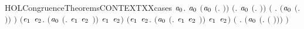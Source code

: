 \begin{SaveVerbatim}{HOLCongruenceTheoremsCONTEXTXXcases}
\HOLTokenTurnstile{} \HOLSymConst{\HOLTokenForall{}}\ensuremath{\HOLBoundVar{a}\sb{\mathrm{0}}}.
        \ensuremath{\HOLBoundVar{a}\sb{\mathrm{0}}} \HOLSymConst{\HOLTokenEquiv{}}
       \ensuremath{(}\ensuremath{\HOLBoundVar{a}\sb{\mathrm{0}}} \HOLSymConst{\ensuremath{=}} \ensuremath{(}\HOLTokenLambda{}. \ensuremath{)}\ensuremath{)} \HOLSymConst{\HOLTokenDisj{}} \ensuremath{(}\HOLSymConst{\HOLTokenExists{}}. \ensuremath{\HOLBoundVar{a}\sb{\mathrm{0}}} \HOLSymConst{\ensuremath{=}} \ensuremath{(}\HOLTokenLambda{}. \ensuremath{)}\ensuremath{)} \HOLSymConst{\HOLTokenDisj{}}
       \ensuremath{(}\HOLSymConst{\HOLTokenExists{}} . \ensuremath{(}\ensuremath{\HOLBoundVar{a}\sb{\mathrm{0}}} \HOLSymConst{\ensuremath{=}} \ensuremath{(}\HOLTokenLambda{}. \HOLSymConst{\ensuremath{\ldotp}} \ensuremath{)}\ensuremath{)} \HOLSymConst{\HOLTokenConj{}}  \ensuremath{)} \HOLSymConst{\HOLTokenDisj{}}
       \ensuremath{(}\HOLSymConst{\HOLTokenExists{}}\ensuremath{\HOLBoundVar{e}\sb{\mathrm{1}}} \ensuremath{\HOLBoundVar{e}\sb{\mathrm{2}}}.
            \ensuremath{(}\ensuremath{\HOLBoundVar{a}\sb{\mathrm{0}}} \HOLSymConst{\ensuremath{=}} \ensuremath{(}\HOLTokenLambda{}. \ensuremath{\HOLBoundVar{e}\sb{\mathrm{1}}}  \HOLSymConst{\ensuremath{+}} \ensuremath{\HOLBoundVar{e}\sb{\mathrm{2}}} \ensuremath{)}\ensuremath{)} \HOLSymConst{\HOLTokenConj{}}  \ensuremath{\HOLBoundVar{e}\sb{\mathrm{1}}} \HOLSymConst{\HOLTokenConj{}}  \ensuremath{\HOLBoundVar{e}\sb{\mathrm{2}}}\ensuremath{)} \HOLSymConst{\HOLTokenDisj{}}
       \ensuremath{(}\HOLSymConst{\HOLTokenExists{}}\ensuremath{\HOLBoundVar{e}\sb{\mathrm{1}}} \ensuremath{\HOLBoundVar{e}\sb{\mathrm{2}}}.
            \ensuremath{(}\ensuremath{\HOLBoundVar{a}\sb{\mathrm{0}}} \HOLSymConst{\ensuremath{=}} \ensuremath{(}\HOLTokenLambda{}. \ensuremath{\HOLBoundVar{e}\sb{\mathrm{1}}}  \HOLSymConst{\ensuremath{\mid}} \ensuremath{\HOLBoundVar{e}\sb{\mathrm{2}}} \ensuremath{)}\ensuremath{)} \HOLSymConst{\HOLTokenConj{}}  \ensuremath{\HOLBoundVar{e}\sb{\mathrm{1}}} \HOLSymConst{\HOLTokenConj{}}  \ensuremath{\HOLBoundVar{e}\sb{\mathrm{2}}}\ensuremath{)} \HOLSymConst{\HOLTokenDisj{}}
       \ensuremath{(}\HOLSymConst{\HOLTokenExists{}} . \ensuremath{(}\ensuremath{\HOLBoundVar{a}\sb{\mathrm{0}}} \HOLSymConst{\ensuremath{=}} \ensuremath{(}\HOLTokenLambda{}.   \ensuremath{(} \ensuremath{)}\ensuremath{)}\ensuremath{)} \HOLSymConst{\HOLTokenConj{}}  \ensuremath{)} \HOLSymConst{\HOLTokenDisj{}}

\end{SaveVerbatim}
